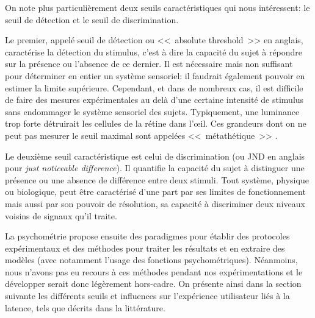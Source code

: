 	\par On note plus particulièrement deux seuils caractéristiques qui nous intéressent: le seuil de détection et le seuil de discrimination. 
	
	\par Le premier, appelé seuil de détection ou <<~absolute threshold~>> en anglais, caractérise la détection du stimulus, c'est à dire la capacité du sujet à répondre sur la présence ou l'absence de ce dernier. Il est nécessaire mais non suffisant pour déterminer en entier un système sensoriel: il faudrait également pouvoir en estimer la limite supérieure. Cependant, et dans de nombreux cas, il est difficile de faire des mesures expérimentales au delà d'une certaine intensité de stimulus sans endommager le système sensoriel des sujets. Typiquement, une luminance trop forte détruirait les cellules de la rétine dans l'œil. Ces grandeurs dont on ne peut pas mesurer le seuil maximal sont appelées <<~métathétique~>> \citep{stevens_psychophysical_1957}.
	
	\par Le deuxième seuil caractéristique est celui de discrimination (ou JND en anglais pour \textit{just noticeable difference}). Il quantifie la capacité du sujet à distinguer une présence ou une absence de différence entre deux stimuli. Tout système, physique ou biologique, peut être caractérisé d'une part par ses limites de fonctionnement mais aussi par son pouvoir de résolution, sa capacité à discriminer deux niveaux voisins de signaux qu'il traite.
	
	\par La psychométrie propose ensuite des paradigmes pour établir des protocoles expérimentaux et des méthodes pour traiter les résultats et en extraire des modèles (avec notamment l'usage des fonctions psychométriques). Néanmoins, nous n'avons pas eu recours à ces méthodes pendant nos expérimentations et le développer serait donc légèrement hors-cadre. On présente ainsi dans la section suivante les différents seuils et influences sur l'expérience utilisateur liés à la latence, tels que décrits dans la littérature.
	
